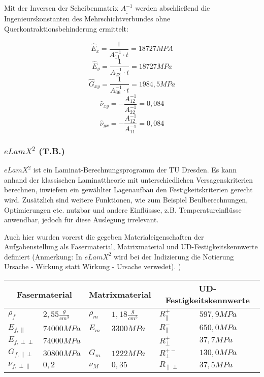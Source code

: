 \noindent Mit der Inversen der Scheibenmatrix $\underline{\underline{A^{-1}}}$ werden abschließend die Ingenieurskonstanten des Mehrschichtverbundes ohne Querkontraktionsbehinderung ermittelt:

\begin{equation}
	\hat{E}_{x}=\frac{1}{A_{11}^{-1}\cdot t} = 18727 MPA
\end{equation}
\begin{equation}
	\hat{E}_{y}=\frac{1}{A_{22}^{-1}\cdot t} = 18727 MPa
\end{equation}
\begin{equation}
	\hat{G}_{xy}=\frac{1}{A_{66}^{-1}\cdot t} = 1984,5 MPa
\end{equation}
\begin{equation}
	\hat{\nu}_{xy}=-\frac{A_{12}^{-1}}{A_{22}^{-1}} = 0,084
\end{equation}
\begin{equation}
	\hat{\nu}_{yx}=-\frac{A_{12}^{-1}}{A_{11}^{-1}} = 0,084
\end{equation}


\subsubsection{$eLamX^{2}$ (T.B.)}\label{elamx}
$eLamX^{2}$ ist ein Laminat-Berechnungsprogramm der TU Dresden. Es kann anhand der klassischen Laminattheorie mit unterschiedlichen Versagenskriterien berechnen, inwiefern ein gewählter Lagenaufbau den Festigkeitskriterien gerecht wird. Zusätzlich sind weitere Funktionen, wie zum Beispiel Beulberechnungen, Optimierungen etc. nutzbar und andere Einflüssse, z.B. Temperatureinflüsse anwendbar, jedoch für diese Auslegung irrelevant.

\noindent Auch hier wurden vorerst die gegeben Materialeigenschaften der Aufgabenstellung als Fasermaterial, Matrixmaterial und  UD-Festigkeitskennwerte definiert (Anmerkung: In $eLamX^{2}$ wird bei der Indizierung die Notierung \glqq Ursache - Wirkung\grqq\: statt \glqq Wirkung - Ursache\grqq\: verwedet). )\\

\begin{tabular}{ll|ll|ll}
	\multicolumn{2}{c}{Fasermaterial} &\multicolumn{2}{c}{Matrixmaterial}  &\multicolumn{2}{c}{UD-Festigkeitskennwerte} \\
	\hline
	$\rho_{f}$ & $2,55 \frac{g}{cm^{3}}$  & $\rho_{m}$ & $1,18 \frac{g}{cm^{3}}$  & $R_{\parallel}^{+}$ & $597,9MPa$ \\
	\hline
	$E_{f,\parallel}$ & $74000MPa$  & $E_{m}$ & $3300MPa$  & $R_{\parallel}^{-}$ & $650,0MPa$\\
	\hline
	$E_{f,\perp\perp}$ & $74000MPa$  &  &   & $R_{\perp}^{+}$ & $37,7MPa$\\
	\hline
	$G_{f,\parallel\perp}$ & $30800MPa$ & $G_{m}$ & $1222MPa$ & $R_{\perp}^{+-}$ & $130,0MPa$\\
	\hline
	$\nu_{f,\perp\parallel}$ & $0,2$  &$\nu_{M}$ &  $0,35$  & $R_{\parallel\perp}$ & $37,5MPa$\\
\end{tabular}\\

